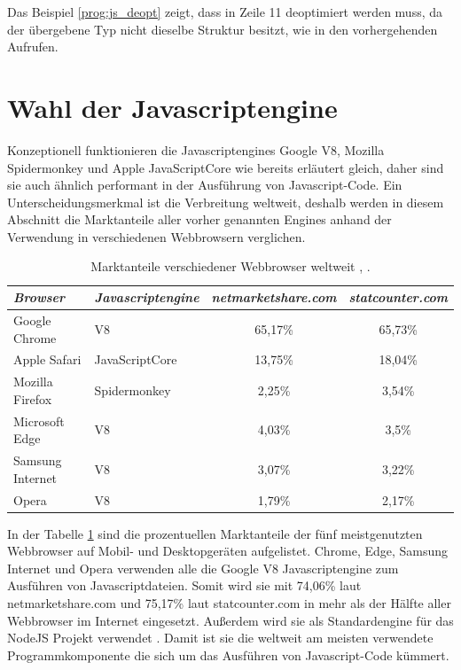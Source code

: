 Das Beispiel \ref{prog:js_deopt} zeigt, dass in Zeile 11 deoptimiert werden muss, da der übergebene Typ nicht dieselbe Struktur besitzt, wie in den
vorhergehenden Aufrufen.

\section{Wahl der Javascriptengine}

Konzeptionell funktionieren die Javascriptengines Google V8, Mozilla Spidermonkey und Apple JavaScriptCore wie bereits erläutert gleich,
daher sind sie auch ähnlich performant in der Ausführung von Javascript-Code. Ein Unterscheidungsmerkmal ist die Verbreitung weltweit, 
deshalb werden in diesem Abschnitt die Marktanteile aller vorher genannten Engines anhand der Verwendung in verschiedenen Webbrowsern verglichen.

\begin{table}[h] \caption{Marktanteile verschiedener Webbrowser weltweit \cite{statcounter}, \cite{netmarketshare}.} 
	\label{tab:js_marketshare} \centering 
	\setlength{\tabcolsep}{3mm} %
	\def\arraystretch{1.25} %
	\begin{tabular}{|l|l|c|c|} \hline 
		\emph{Browser} & \emph{Javascriptengine} & \emph{netmarketshare.com} & \emph{statcounter.com} \\ 
		\hline 
		\hline Google Chrome & V8 & 65,17\% & 65,73\% \\ 
		\hline Apple Safari & JavaScriptCore & 13,75\% & 18,04\% \\
		\hline Mozilla Firefox &  Spidermonkey  & 2,25\% & 3,54\% \\ 
		\hline Microsoft Edge & V8 & 4,03\% & 3,5\% \\ 
		\hline Samsung Internet & V8 & 3,07\% & 3,22\% \\ 
		\hline Opera & V8 & 1,79\% & 2,17\% \\ 
		\hline 
	\end{tabular} 
\end{table}

In der Tabelle \ref{tab:js_marketshare} sind die prozentuellen Marktanteile der fünf meistgenutzten Webbrowser auf Mobil- und Desktopgeräten aufgelistet. 
Chrome, Edge, Samsung Internet und Opera verwenden alle die Google V8 Javascriptengine zum Ausführen von Javascriptdateien. Somit wird sie 
mit 74,06\% laut netmarketshare.com und 75,17\% laut statcounter.com in mehr als der Hälfte aller Webbrowser im Internet eingesetzt.
Außerdem wird sie als Standardengine für das NodeJS Projekt verwendet \cite{nodejs}. Damit ist sie die weltweit am 
meisten verwendete Programmkomponente die sich um das Ausführen von Javascript-Code kümmert.

